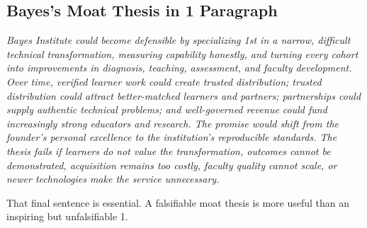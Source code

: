 \subsection{Bayes's Moat Thesis in 1 Paragraph}
\label{sec:bayes_moat_thesis_one_paragraph}

\textit{Bayes Institute could become defensible by specializing 1st in a narrow, difficult technical transformation, measuring capability honestly, and turning every cohort into improvements in diagnosis, teaching, assessment, and faculty development. Over time, verified learner work could create trusted distribution; trusted distribution could attract better-matched learners and partners; partnerships could supply authentic technical problems; and well-governed revenue could fund increasingly strong educators and research. The promise would shift from the founder's personal excellence to the institution's reproducible standards. The thesis fails if learners do not value the transformation, outcomes cannot be demonstrated, acquisition remains too costly, faculty quality cannot scale, or newer technologies make the service unnecessary.}

That final sentence is essential. A falsifiable moat thesis is more useful than an inspiring but unfalsifiable 1.
